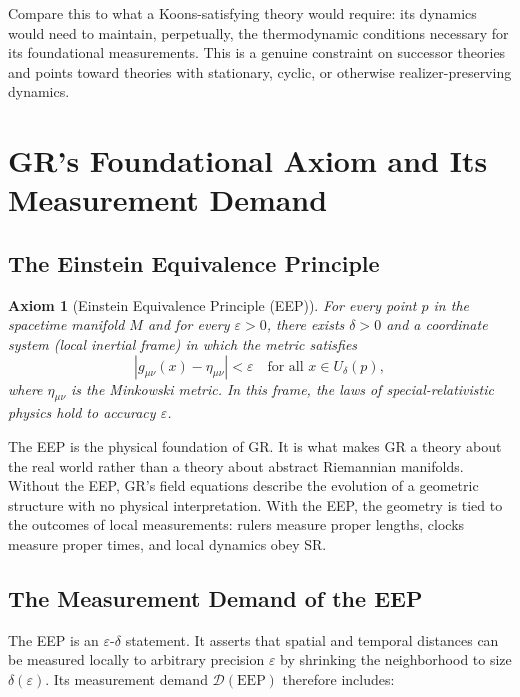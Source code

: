 \documentclass[11pt,a4paper]{article}
\newtheorem{axiom}{Axiom}
\begin{document}
Compare this to what a Koons-satisfying theory would require: its dynamics would need
to maintain, perpetually, the thermodynamic conditions necessary for its foundational
measurements. This is a genuine constraint on successor theories and points toward
theories with stationary, cyclic, or otherwise realizer-preserving dynamics.

\section{GR's Foundational Axiom and Its Measurement Demand}
\label{sec:eep}

\subsection{The Einstein Equivalence Principle}

\begin{axiom}[Einstein Equivalence Principle (EEP)]
\label{ax:eep}
For every point $p$ in the spacetime manifold $M$ and for every $\varepsilon > 0$,
there exists $\delta > 0$ and a coordinate system (local inertial frame) in which the
metric satisfies
\[
|g_{\mu\nu}(x) - \eta_{\mu\nu}| < \varepsilon \quad \text{for all } x \in U_\delta(p),
\]
where $\eta_{\mu\nu}$ is the Minkowski metric. In this frame, the laws of
special-relativistic physics hold to accuracy $\varepsilon$.
\end{axiom}

The EEP is the physical foundation of GR. It is what makes GR a theory about
the real world rather than a theory about abstract Riemannian manifolds. Without the
EEP, GR's field equations describe the evolution of a geometric structure with no
physical interpretation. With the EEP, the geometry is tied to the outcomes of
local measurements: rulers measure proper lengths, clocks measure proper times, and
local dynamics obey SR.

\subsection{The Measurement Demand of the EEP}

The EEP is an $\varepsilon$-$\delta$ statement. It asserts that spatial and temporal
distances can be measured locally to arbitrary precision $\varepsilon$ by shrinking the
neighborhood to size $\delta(\varepsilon)$. Its measurement demand $\mathcal{D}(\mathrm{EEP})$
therefore includes:
\end{document}
